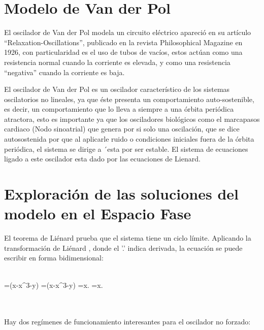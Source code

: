 \documentclass{article}
\begin{document}
\section{Modelo de Van der Pol}

El oscilador de Van der Pol modela un circuito eléctrico apareció en su artículo
“Relaxation-Oscillations”, publicado en la revista Philosophical Magazine en 1926, con particularidad es el uso de tubos de vacíos, estos actúan como una resistencia normal cuando la corriente es elevada, y como una resistencia “negativa” cuando la corriente es baja.

El oscilador de Van der Pol es un oscilador característico
de los sistemas oscilatorios no lineales, ya que éste presenta
un comportamiento auto-sostenible, es decir, un comportamiento
que lo lleva a siempre a una órbita periódica
atractora, esto es importante ya que los osciladores biológicos
como el marcapasos cardiaco (Nodo sinoatrial) que
genera por si solo una oscilación, que se dice autosostenida
por que al aplicarle ruido o condiciones iniciales fuera de
la órbita periódica, el sistema se dirige a ´esta por ser estable.
El sistema de ecuaciones ligado a este oscilador esta dado
por las ecuaciones de Lienard.

\section{Exploración de las soluciones del modelo en el Espacio Fase}

El teorema de Liénard prueba que el sistema tiene un ciclo límite. Aplicando la transformación de Liénard , donde el '.' indica derivada, la ecuación se puede escribir en forma bidimensional:
\\
\\
\begin{center}
{=\mu \left(x-{}x^{3}-y\right)} {=\mu \left(x-{}x^{3}-y\right)}
{={}x.} {={}x.}

\end{center}
\\
\\
Hay dos regímenes de funcionamiento interesantes para el oscilador no forzado:
\end{document}
